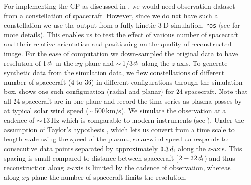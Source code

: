         For implementing the GP as discussed in , we would need observation dataset
        from a constellation of spacecraft. However, since we do not have such a constellation we
        use the output from a fully kinetic 3-D simulation, \texttt{ros} (see  for
        more details). This enables us to test the effect of various number of spacecraft and their
        relative orientation and positioning on the quality of reconstructed image. For the ease of
        computation we down-sampled the original data to have resolution of 1\,$d_{\rm i}$ in the
        $xy$-plane and $\sim$\,1/3\,$d_{\rm i}$ along the $z$-axis. To generate synthetic data from
        the simulation data, we flew constellations of different number of spacecraft (4 to 36) in
        different configurations through the simulation box.  shows one such
        configuration (radial and planar) for 24 spacecraft. Note that all 24 spacecraft are in one
        plane and record the time series as plasma passes by at typical solar wind speed
        ($\sim$\,500\,km/s). We simulate the observation at a cadence of $\sim$\,13\,Hz which is
        comparable to modern instruments (see ). Under the assumption of Taylor's
        hypothesis \citep{Taylor1938}, which lets us convert from a time scale to length scale using
        the speed of the plasma, solar-wind speed corresponds to consecutive data points separated
        by approximately $0.3\,d_{\rm i}$ along the $z$-axis. This spacing is small compared to
        distance between spacecraft ($2 - 22\,d_{\rm i}$) and thus reconstruction along $z$-axis is
        limited by the cadence of observation, whereas along $xy$-plane the number of spacecraft
        limits the resolution.
